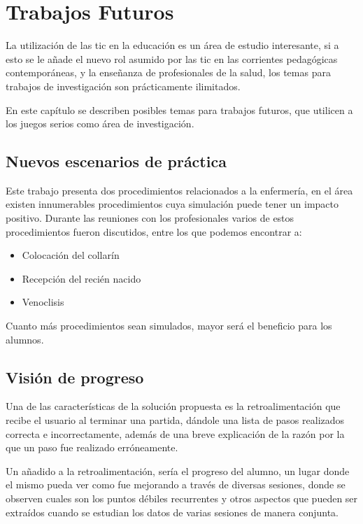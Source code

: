 \chapter{Trabajos Futuros}
\label{chap:futuro}

La utilización de las \Gls{tic} en la educación es un área de estudio
interesante, si a esto se le añade el nuevo rol asumido por las \Gls{tic} en las
corrientes pedagógicas contemporáneas, y la enseñanza de profesionales de la
salud, los temas para trabajos de investigación son prácticamente ilimitados. 

En este capítulo se describen posibles temas para trabajos futuros, que utilicen
a los juegos serios como área de investigación.

\section{Nuevos escenarios de práctica}

Este trabajo presenta dos procedimientos relacionados a la enfermería, en el
área existen innumerables procedimientos cuya simulación puede tener un impacto
positivo. Durante las reuniones con los profesionales varios de estos
procedimientos fueron discutidos, entre los que podemos encontrar a:

\begin{itemize}
    \item Colocación del collarín
    \item Recepción del recién nacido
    \item Venoclisis
\end{itemize}

Cuanto más procedimientos sean simulados, mayor será el beneficio para los alumnos.

\section{Visión de progreso}

Una de las características de la solución propuesta es la retroalimentación que
recibe el usuario al terminar una partida, dándole una lista de pasos
realizados correcta e incorrectamente, además de una breve explicación de la
razón por la que un paso fue realizado erróneamente.

Un añadido a la retroalimentación, sería el progreso del alumno, un lugar donde
el mismo pueda ver como fue mejorando a través de diversas sesiones, donde se
observen cuales son los puntos débiles recurrentes y otros aspectos que pueden
ser extraídos cuando se estudian los datos de varias sesiones de manera
conjunta. 

